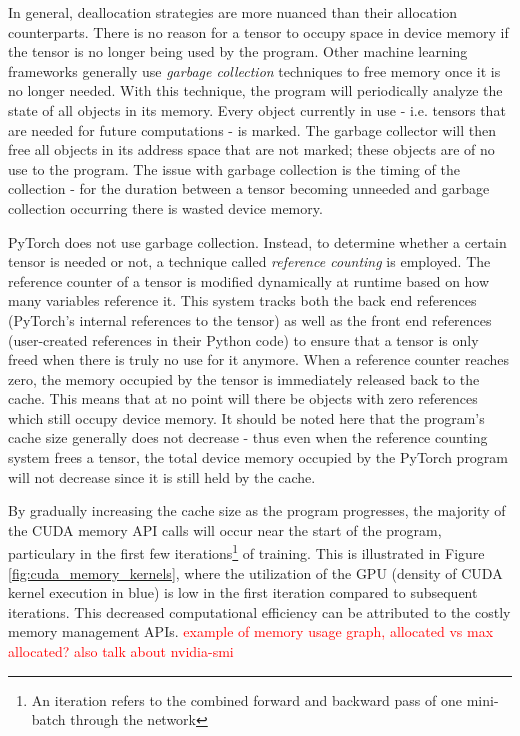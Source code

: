 \documentclass[12pt,letterpaper]{article}
\newcommand\myworries[1]{\textcolor{red}{#1}}
\begin{document}
In general, deallocation strategies are more nuanced than their allocation counterparts. There is no reason for a tensor to occupy space in device memory if the tensor is no longer being used by the program. Other machine learning frameworks generally use \textit{garbage collection} techniques to free memory once it is no longer needed. With this technique, the program will periodically analyze the state of all objects in its memory. Every object currently in use - i.e. tensors that are needed for future computations - is marked. The garbage collector will then free all objects in its address space that are not marked; these objects are of no use to the program. The issue with garbage collection is the timing of the collection - for the duration between a tensor becoming unneeded and garbage collection occurring there is wasted device memory.
\par 

PyTorch does not use garbage collection. Instead, to determine whether a certain tensor is needed or not, a technique called \textit{reference counting} is employed. The reference counter of a tensor is modified dynamically at runtime based on how many variables reference it. This system tracks both the back end references (PyTorch's internal references to the tensor) as well as the front end references (user-created references in their Python code) to ensure that a tensor is only freed when there is truly no use for it anymore. When a reference counter reaches zero, the memory occupied by the tensor is immediately released back to the cache. This means that at no point will there be objects with zero references which still occupy device memory. It should be noted here that the program's cache size generally does not decrease - thus even when the reference counting system frees a tensor, the total device memory occupied by the PyTorch program will not decrease since it is still held by the cache.
\par 

By gradually increasing the cache size as the program progresses, the majority of the CUDA memory API calls will occur near the start of the program, particulary in the first few iterations\footnote{An iteration refers to the combined forward and backward pass of one mini-batch through the network} of training. This is illustrated in Figure \ref{fig:cuda_memory_kernels}, where the utilization of the GPU (density of CUDA kernel execution in blue) is low in the first iteration compared to subsequent iterations. This decreased computational efficiency can be attributed to the costly memory management APIs.
\myworries{example of memory usage graph, allocated vs max allocated? also talk about nvidia-smi}
\end{document}
